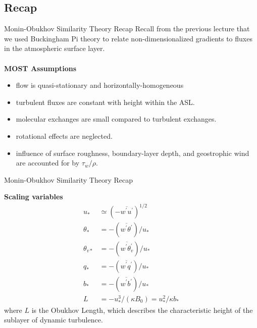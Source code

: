 \subsection{Recap}
\begin{frame}{Monin-Obukhov Similarity Theory Recap}
Recall from the previous lecture that we used Buckingham Pi theory to relate non-dimensionalized gradients to fluxes in the atmospheric surface layer.
~\\~\\
\textbf{MOST Assumptions}
\begin{itemize}
	\item flow is quasi-stationary and horizontally-homogeneous
	\item turbulent fluxes are constant with height within the ASL.
	\item molecular exchanges are small compared to turbulent exchanges.
	\item rotational effects are neglected.
	\item influence of surface roughness, boundary-layer depth, and geostrophic wind are accounted for by $\tau_w/\rho$.
\end{itemize}
\end{frame}
\begin{frame}{Monin-Obukhov Similarity Theory Recap}

\textbf{Scaling variables}
\begin{align*}
	u_* &\simeq (-\overline{w^\prime u^\prime})^{1/2} \\
	\theta_* &= -(\overline{w^\prime \theta^\prime})/u_*\\
	\theta_{v*} &= -(\overline{w^\prime \theta_v^\prime})/u_*\\
	q_* &= -(\overline{w^\prime q^\prime})/u_*\\
	b_* &= -(\overline{w^\prime b^\prime})/u_*\\
	L&=-u_*^3/(\kappa B_0) = u_*^2 / \kappa b_*
	\end{align*}
	where $L$ is the Obukhov Length, which describes the characteristic height of the sublayer of dynamic turbulence.
\end{frame}

